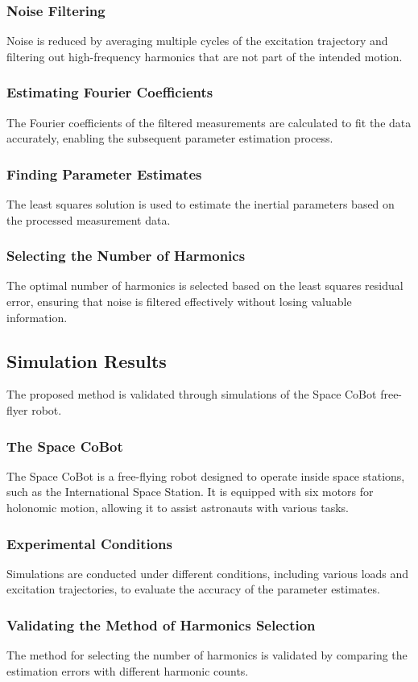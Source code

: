 \documentclass[a4paper,12pt]{article}
\begin{document}
    \subsubsection{Noise Filtering}
    Noise is reduced by averaging multiple cycles of the excitation trajectory and filtering out high-frequency harmonics that are not part of the intended motion.
    \subsubsection{Estimating Fourier Coefficients}
    The Fourier coefficients of the filtered measurements are calculated to fit the data accurately, enabling the subsequent parameter estimation process.
    \subsubsection{Finding Parameter Estimates}
    The least squares solution is used to estimate the inertial parameters based on the processed measurement data.
    \subsubsection{Selecting the Number of Harmonics}
    The optimal number of harmonics is selected based on the least squares residual error, ensuring that noise is filtered effectively without losing valuable information.

    \subsection{Simulation Results}
    The proposed method is validated through simulations of the Space CoBot free-flyer robot.
    \subsubsection{The Space CoBot}
    The Space CoBot is a free-flying robot designed to operate inside space stations, such as the International Space Station. It is equipped with six motors for holonomic motion, allowing it to assist astronauts with various tasks.
    \subsubsection{Experimental Conditions}
    Simulations are conducted under different conditions, including various loads and excitation trajectories, to evaluate the accuracy of the parameter estimates.
    \subsubsection{Validating the Method of Harmonics Selection}
    The method for selecting the number of harmonics is validated by comparing the estimation errors with different harmonic counts.
\end{document}

